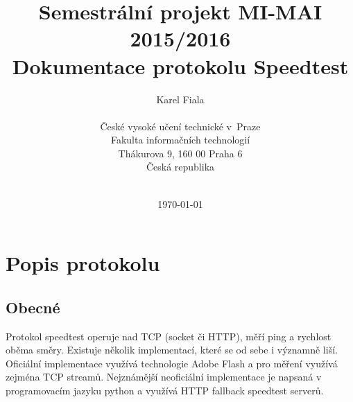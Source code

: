 \documentclass[12pt,a4paper]{article}
\begin{document}
\title{Semestrální projekt MI-MAI\\ 2015/2016\\
Dokumentace protokolu Speedtest \\
\vspace{10px}}
\author{Karel Fiala \\
\vspace{10px} \\
\small České vysoké učení technické v~Praze\\
\small Fakulta informačních technologií\\
\small Thákurova 9, 160 00 Praha 6\\
\small Česká republika \\
\vspace{10px} \\
}
\date{\today}
\maketitle
\thispagestyle{empty}


\clearpage
\thispagestyle{empty}
\tableofcontents
\clearpage

%




\section{Popis protokolu}

\subsection{Obecné}

Protokol speedtest operuje nad TCP (socket či HTTP), měří ping a rychlost oběma směry. Existuje několik implementací, které se od sebe i významně liší. Oficiální implementace využívá technologie Adobe Flash a pro měření využívá zejména TCP streamů. Nejznámější neoficiální implementace je napsaná v programovacím jazyku python a využívá HTTP fallback speedtest serverů. 
\end{document}
